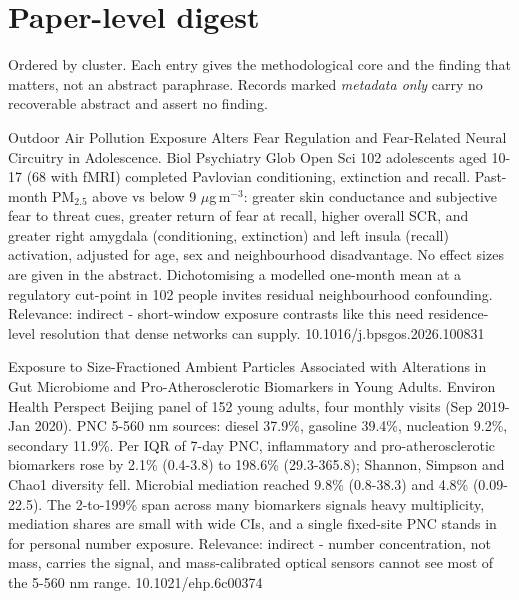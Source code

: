 \documentclass[10pt]{article}
\begin{document}
\vspace{4mm}

\par{}\baselineskip{}\baselineskip
\section*{\sffamily\bfseries\color{Deep}Paper-level digest}
\vspace{-1.5mm}{\color{Amber}\rule{\linewidth}{1.1pt}}\vspace{2.5mm}

{\fontsize{7.4}{9}\selectfont\color{Slate}Ordered by cluster. Each entry gives the
methodological core and the finding that matters, not an abstract paraphrase. Records
marked \textit{metadata only} carry no recoverable abstract and assert no finding.\par}


{Outdoor Air Pollution Exposure Alters Fear Regulation and Fear-Related Neural Circuitry in Adolescence.}
{Biol Psychiatry Glob Open Sci}
{102 adolescents aged 10-17 (68 with fMRI) completed Pavlovian conditioning, extinction and recall. Past-month PM$_{2.5}$ above vs below 9 $\mu$g\,m$^{-3}$: greater skin conductance and subjective fear to threat cues, greater return of fear at recall, higher overall SCR, and greater right amygdala (conditioning, extinction) and left insula (recall) activation, adjusted for age, sex and neighbourhood disadvantage. No effect sizes are given in the abstract. Dichotomising a modelled one-month mean at a regulatory cut-point in 102 people invites residual neighbourhood confounding. Relevance: indirect - short-window exposure contrasts like this need residence-level resolution that dense networks can supply.}
{10.1016/j.bpsgos.2026.100831}

\par{}\baselineskip{}\baselineskip
{}

{Exposure to Size-Fractioned Ambient Particles Associated with Alterations in Gut Microbiome and Pro-Atherosclerotic Biomarkers in Young Adults.}
{Environ Health Perspect}
{Beijing panel of 152 young adults, four monthly visits (Sep 2019-Jan 2020). PNC 5-560 nm sources: diesel 37.9\%, gasoline 39.4\%, nucleation 9.2\%, secondary 11.9\%. Per IQR of 7-day PNC, inflammatory and pro-atherosclerotic biomarkers rose by 2.1\% (0.4-3.8) to 198.6\% (29.3-365.8); Shannon, Simpson and Chao1 diversity fell. Microbial mediation reached 9.8\% (0.8-38.3) and 4.8\% (0.09-22.5). The 2-to-199\% span across many biomarkers signals heavy multiplicity, mediation shares are small with wide CIs, and a single fixed-site PNC stands in for personal number exposure. Relevance: indirect - number concentration, not mass, carries the signal, and mass-calibrated optical sensors cannot see most of the 5-560 nm range.}
{10.1021/ehp.6c00374}
\end{document}
